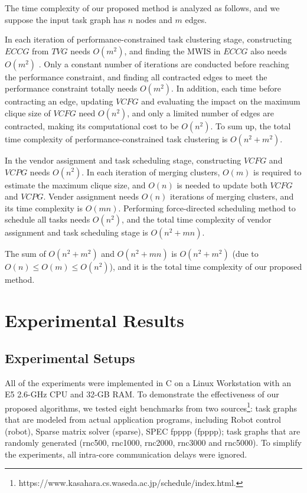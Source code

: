 \documentclass[10pt,journal]{IEEEtran}
\begin{document}
The time complexity of our proposed method is analyzed as follows, and we suppose the input task graph has $n$ nodes and $m$ edges.

In each iteration of performance-constrained task clustering stage, constructing $ECCG$ from $TVG$ needs $O(m^2)$, and finding the MWIS in $ECCG$ also needs $O(m^2)$ \cite{conference:LC}. Only a constant number of iterations are conducted before reaching the performance constraint, and finding all contracted edges to meet the performance constraint totally needs $O(m^2)$. In addition, each time before contracting an edge, updating $VCFG$ and evaluating the impact on the maximum clique size of $VCFG$ need $O(n^2)$, and only a limited number of edges are contracted, making its computational cost to be $O(n^2)$. To sum up, the total time complexity of performance-constrained task clustering is $O(n^2+m^2)$.

In the vendor assignment and task scheduling stage, constructing $VCFG$ and $VCPG$ needs $O(n^2)$. In each iteration of merging clusters, $O(m)$ is required to estimate the maximum clique size, and $O(n)$ is needed to update both $VCFG$ and $VCPG$. Vender assignment needs $O(n)$ iterations of merging clusters, and its time complexity is $O(mn)$. Performing force-directed scheduling method to schedule all tasks needs $O(n^2)$, and the total time complexity of vendor assignment and task scheduling stage is $O(n^2+mn)$.

The sum of $O(n^2+m^2)$ and $O(n^2+mn)$ is $O(n^2+m^2)$ (due to $O(n)\leq O(m)\leq O(n^2)$), and it is the total time complexity of our proposed method.


\section{Experimental Results}

\subsection{Experimental Setups}
All of the experiments were implemented in C on a Linux Workstation with an E5 2.6-GHz CPU and 32-GB RAM. To demonstrate the effectiveness of our proposed algorithms, we tested eight benchmarks from two sources\footnote{https://www.kasahara.cs.waseda.ac.jp/schedule/index.html.}: task graphs that are modeled from actual application programs, including Robot control (robot), Sparse matrix solver (sparse), SPEC fpppp (fpppp); task graphs that are randomly generated (rnc500, rnc1000, rnc2000, rnc3000 and rnc5000). To simplify the experiments, all intra-core communication delays were ignored.
\end{document}
